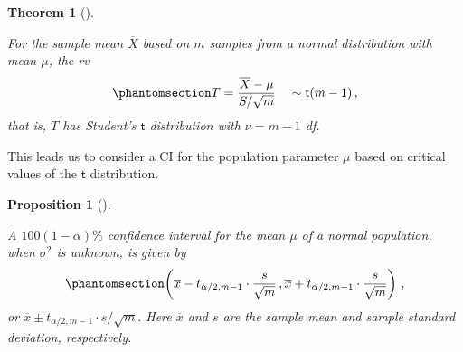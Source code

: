 \documentclass[
  a4paper,
  DIV=11,
  numbers=noendperiod,
  oneside]{scrreprt}
\theoremstyle{definition}
\theoremstyle{definition}
\theoremstyle{plain}
\newtheorem{proposition}{Proposition}[chapter]
\theoremstyle{plain}
\newtheorem{theorem}{Theorem}[chapter]
\theoremstyle{definition}
\theoremstyle{remark}
\begin{document}
\begin{theorem}[]\protect\hypertarget{thm-sample-mean-t-dist}{}\label{thm-sample-mean-t-dist}

For the sample mean \(\overline{X}\) based on \(m\) samples from a
normal distribution with mean \(\mu\), the rv
\begin{equation}\phantomsection\label{eq-t-statistic-mean}{
 T = \frac{\overline{X} - \mu}{S/\sqrt{m}}  \quad \sim \mathsf{t}(m-1)\,,
}\end{equation} that is, \(T\) has Student's \(\mathsf{t}\) distribution
with \(\nu = m-1\) df.

\end{theorem}

This leads us to consider a CI for the population parameter \(\mu\)
based on critical values of the \(\mathsf{t}\) distribution.

\begin{proposition}[]\protect\hypertarget{prp-ci-norm-unknown-var}{}\label{prp-ci-norm-unknown-var}

A \(100(1-\alpha)\%\) confidence interval for the mean \(\mu\) of a
normal population, when \(\sigma^2\) is unknown, is given by
\begin{equation}\phantomsection\label{eq-ci-norm-unknown-var}{
 \left(\overline{x} - t_{\alpha/2, m-1} \cdot \frac{s}{\sqrt{m}}\,, 
        \overline{x} + t_{\alpha/2, m-1} \cdot \frac{s}{\sqrt{m}} \right)\,, 
}\end{equation} or
\(\overline{x} \pm t_{\alpha/2, m-1} \cdot s/ \sqrt{m}.\) Here
\(\overline{x}\) and \(s\) are the sample mean and sample standard
deviation, respectively.

\end{proposition}
\end{document}
